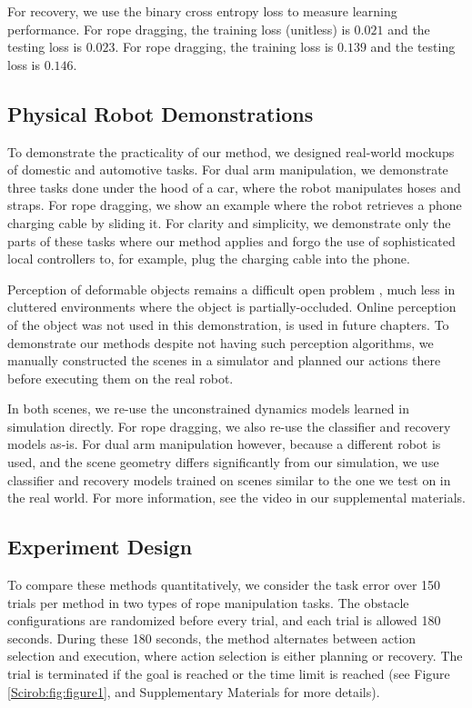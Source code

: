 For recovery, we use the binary cross entropy loss to measure learning performance. For rope dragging, the training loss (unitless) is $0.021$ and the testing loss is $0.023$. For rope dragging, the training loss is $0.139$ and the testing loss is $0.146$. 

\subsection{Physical Robot Demonstrations}
\label{Scirob:sec:physical_robot_details}
To demonstrate the practicality of our method, we designed real-world mockups of domestic and automotive tasks. For dual arm manipulation, we demonstrate three tasks done under the hood of a car, where the robot manipulates hoses and straps. For rope dragging, we show an example where the robot retrieves a phone charging cable by sliding it. For clarity and simplicity, we demonstrate only the parts of these tasks where our method applies and forgo the use of sophisticated local controllers to, for example, plug the charging cable into the phone.

Perception of deformable objects remains a difficult open problem \cite{Yan2020}, much less in cluttered environments where the object is partially-occluded. Online perception of the object was not used in this demonstration, is used in future chapters. To demonstrate our methods despite not having such perception algorithms, we manually constructed the scenes in a simulator and planned our actions there before executing them on the real robot.

In both scenes, we re-use the unconstrained dynamics models learned in simulation directly. For rope dragging, we also re-use the classifier and recovery models as-is. For dual arm manipulation however, because a different robot is used, and the scene geometry differs significantly from our simulation, we use classifier and recovery models trained on scenes similar to the one we test on in the real world.  For more information, see the video in our supplemental materials. 

\subsection{Experiment Design}
To compare these methods quantitatively, we consider the task error over 150 trials per method in two types of rope manipulation tasks. The obstacle configurations are randomized before every trial, and each trial is allowed 180 seconds. During these 180 seconds, the method alternates between action selection and execution, where action selection is either planning or recovery. The trial is terminated if the goal is reached or the time limit is reached (see Figure \ref{Scirob:fig:figure1}, and Supplementary Materials for more details).

